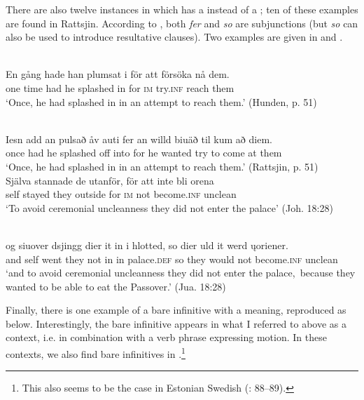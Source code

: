 \documentclass[output=paper]{langscibook}
\begin{document}
There are also twelve instances in which  has a  instead of a ; ten of these examples are found in Rattsjin. According to \citet[491]{AkerbergNystrom2012}, both \textit{fer} and \textit{so} are  subjunctions (but \textit{so} can also be used to introduce resultative clauses). Two examples are given in  and .  

\ea
\label{ex:kalm:20}
\ea {}\label{ex:kalm:20a}\\
\gll En gång hade han plumsat i för att försöka nå dem.\\
one time had he splashed in for \textsc{im} try.\textsc{inf} reach them\\ 
\glt ‘Once, he had splashed in in an attempt to reach them.’ (Hunden, p. 51)

\ex {}\label{ex:kalm:20b}\\
\gll Iesn add an pulsað åv auti fer an willd biuäð til kum að diem.\\
once had he splashed off into for he wanted try to come at them\\
\glt ‘Once, he had splashed in in an attempt to reach them.’ (Rattsjin, p. 51)
\z 
\ex
\label{ex:kalm:21}
\ea {}\label{ex:kalm:21a}\\ 
\gll Själva stannade de utanför, för att inte bli orena\\
self stayed they outside for \textsc{im} not become.\textsc{inf} unclean\\
\glt ‘To avoid ceremonial uncleanness they did not enter the palace’ (Joh. 18:28)

\ex {}\label{ex:kalm:21b}\\
\gll og siuover dsjingg dier it in i hlotted, so dier uld it werd \k{u}oriener.\\
and self went they not in in palace.\textsc{def} so they would not become.\textsc{inf} unclean\\
\glt ‘and to avoid ceremonial uncleanness they did not enter the palace,{~}because they wanted to be able to eat the Passover.’ (Jua. 18:28)
\z 
\z\largerpage[2]


Finally, there is one example of a bare infinitive with a  meaning, reproduced as  below. Interestingly, the bare infinitive appears in what I referred to above as a  context, i.e. in combination with a verb phrase expressing motion. In these contexts, we also find bare infinitives in .\footnote{This also seems to be the case in Estonian Swedish (\citealt{Lagman1958}: 88–89).} 
\end{document}

